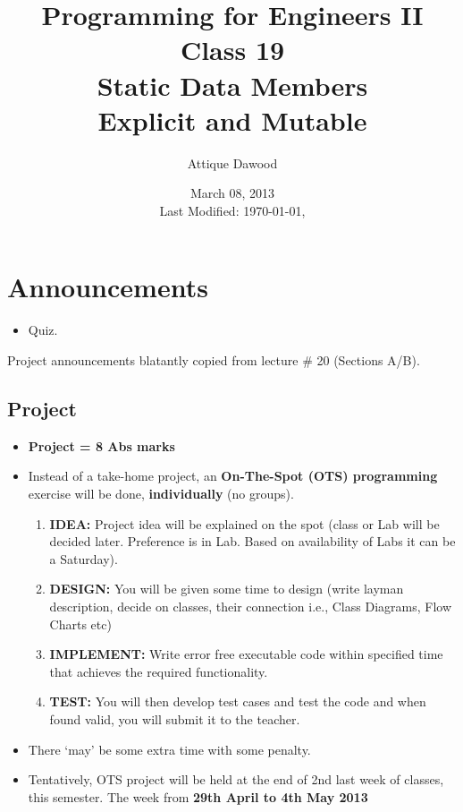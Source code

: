 \documentclass[12pt,a4paper]{article}
\title{\vspace{-2cm}Programming for Engineers II\\Class 19\\Static Data Members\\Explicit and Mutable}
\author{Attique Dawood}
\date{March 08, 2013\\[0.2cm] Last Modified: \today, \currenttime}
\begin{document}
\maketitle
\section{Announcements}
\begin{itemize}
\item Quiz.
\end{itemize}
Project announcements blatantly copied from lecture \# 20 (Sections A/B).
\subsection{Project}
\begin{itemize}
\item \textbf{Project = 8 Abs marks}
\item Instead of a take-home project, an \textbf{On-The-Spot (OTS) programming} exercise will be done, \textbf{individually} (no groups).
	\begin{enumerate}
	\item \textbf{IDEA:} Project idea will be explained on the spot (class or Lab will be decided later. Preference is in Lab. Based on availability of Labs it can be a Saturday).
	\item \textbf{DESIGN:} You will be given some time to design (write layman description, decide on classes, their connection i.e., Class Diagrams, Flow Charts etc)
	\item \textbf{IMPLEMENT:} Write error free executable code within specified time that achieves the required functionality.
	\item \textbf{TEST:} You will then develop test cases and test the code and when found valid, you will submit it to the teacher.
	\end{enumerate}
\item There ‘may’ be some extra time with some penalty.
\item Tentatively, OTS project will be held at the end of 2nd last week of classes, this semester. The week from \textbf{29th April to 4th May 2013}
\end{itemize}
\newpage
\end{document}
